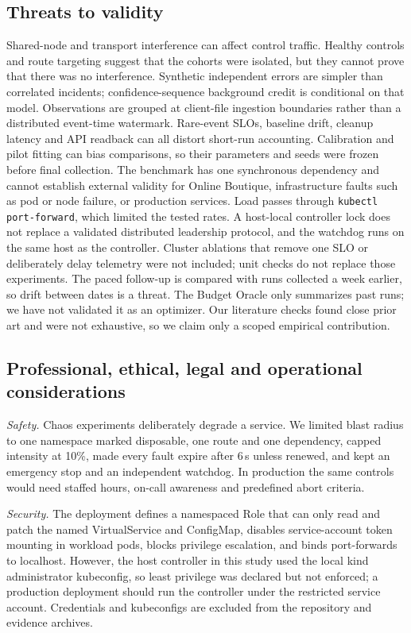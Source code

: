 \documentclass[a4paper,fleqn,11pt]{cas-dc}
\begin{document}
\subsection{Threats to validity}
Shared-node and transport interference can affect control traffic. Healthy controls and route targeting suggest that the cohorts were isolated, but they cannot prove that there was no interference. Synthetic independent errors are simpler than correlated incidents; confidence-sequence background credit is conditional on that model. Observations are grouped at client-file ingestion boundaries rather than a distributed event-time watermark. Rare-event SLOs, baseline drift, cleanup latency and API readback can all distort short-run accounting. Calibration and pilot fitting can bias comparisons, so their parameters and seeds were frozen before final collection. The benchmark has one synchronous dependency and cannot establish external validity for Online Boutique, infrastructure faults such as pod or node failure, or production services. Load passes through \texttt{kubectl port-forward}, which limited the tested rates. A host-local controller lock does not replace a validated distributed leadership protocol, and the watchdog runs on the same host as the controller. Cluster ablations that remove one SLO or deliberately delay telemetry were not included; unit checks do not replace those experiments. The paced follow-up is compared with runs collected a week earlier, so drift between dates is a threat. The Budget Oracle only summarizes past runs; we have not validated it as an optimizer. Our literature checks found close prior art and were not exhaustive, so we claim only a scoped empirical contribution.

\subsection{Professional, ethical, legal and operational considerations}
\textit{Safety.} Chaos experiments deliberately degrade a service. We limited blast radius to one namespace marked disposable, one route and one dependency, capped intensity at 10\%, made every fault expire after 6\,s unless renewed, and kept an emergency stop and an independent watchdog. In production the same controls would need staffed hours, on-call awareness and predefined abort criteria.

\textit{Security.} The deployment defines a namespaced Role that can only read and patch the named VirtualService and ConfigMap, disables service-account token mounting in workload pods, blocks privilege escalation, and binds port-forwards to localhost. However, the host controller in this study used the local kind administrator kubeconfig, so least privilege was declared but not enforced; a production deployment should run the controller under the restricted service account. Credentials and kubeconfigs are excluded from the repository and evidence archives.
\end{document}
